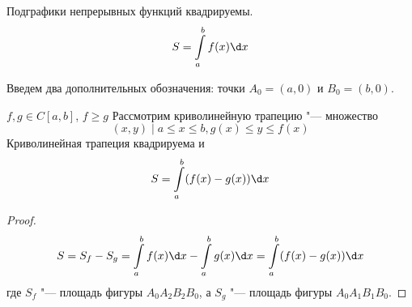 \begin{Rem}
	Подграфики непрерывных функций квадрируемы.
	\[ S = \int\limits_a^b f(x) \d x \]
\end{Rem}


Введем два дополнительных обозначения: точки $A_0 = (a, 0)$ и $B_0 = (b, 0)$.
\begin{assertion}
	$f, g \in C[a,b]$, $f \ge g$
	Рассмотрим криволинейную трапецию "--- множество
	\[ {(x,y) \mid a \le x \le b, g(x) \le y \le f(x)} \]
	Криволинейная трапеция квадрируема и
	\[ S = \int\limits_a^b (f(x)-g(x))\d x \]
\end{assertion}

\begin{proof}
	\[ S = S_f - S_g = \int\limits_a^b f(x) \d x - \int\limits_a^b g(x) \d x = \int\limits_a^b (f(x) - g(x)) \d x \]
	где $S_f$ "--- площадь фигуры $A_0A_2B_2B_0$, а $S_g$ "--- площадь фигуры $A_0A_1B_1B_0$.
\end{proof}

